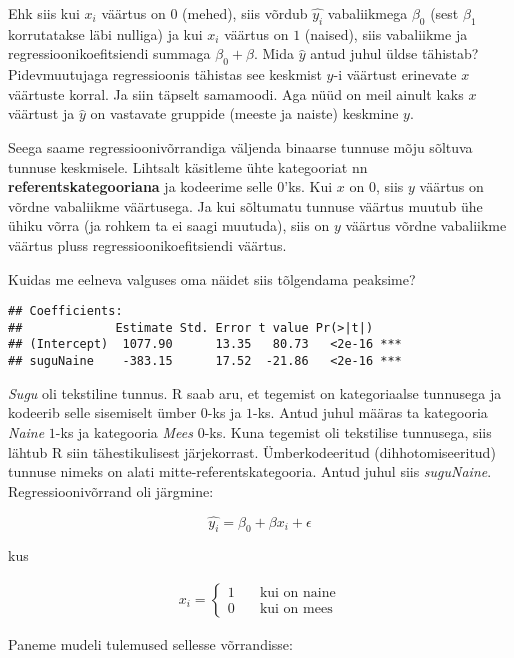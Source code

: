 \documentclass[
]{book}
\begin{document}
Ehk siis kui \(x_i\) väärtus on \(0\) (mehed), siis võrdub \(\hat{y_i}\) vabaliikmega \(\beta_0\) (sest \(\beta_1\) korrutatakse läbi nulliga) ja kui \(x_i\) väärtus on \(1\) (naised), siis vabaliikme ja regressioonikoefitsiendi summaga \(\beta_0+\beta\). Mida \(\hat{y}\) antud juhul üldse tähistab? Pidevmuutujaga regressioonis tähistas see keskmist \(y\)-i väärtust erinevate \(x\) väärtuste korral. Ja siin täpselt samamoodi. Aga nüüd on meil ainult kaks \(x\) väärtust ja \(\hat{y}\) on vastavate gruppide (meeste ja naiste) keskmine \(y\).

Seega saame regressioonivõrrandiga väljenda binaarse tunnuse mõju sõltuva tunnuse keskmisele. Lihtsalt käsitleme ühte kategooriat nn \textbf{referentskategooriana} ja kodeerime selle \(0\)'ks. Kui \(x\) on \(0\), siis \(y\) väärtus on võrdne vabaliikme väärtusega. Ja kui sõltumatu tunnuse väärtus muutub ühe ühiku võrra (ja rohkem ta ei saagi muutuda), siis on \(y\) väärtus võrdne vabaliikme väärtus pluss regressioonikoefitsiendi väärtus.

Kuidas me eelneva valguses oma näidet siis tõlgendama peaksime?

\begin{verbatim}
## Coefficients:
##             Estimate Std. Error t value Pr(>|t|)    
## (Intercept)  1077.90      13.35   80.73   <2e-16 ***
## suguNaine    -383.15      17.52  -21.86   <2e-16 ***
\end{verbatim}

\emph{Sugu} oli tekstiline tunnus. R saab aru, et tegemist on kategoriaalse tunnusega ja kodeerib selle sisemiselt ümber \(0\)-ks ja \(1\)-ks. Antud juhul määras ta kategooria \emph{Naine} \(1\)-ks ja kategooria \emph{Mees} \(0\)-ks. Kuna tegemist oli tekstilise tunnusega, siis lähtub R siin tähestikulisest järjekorrast. Ümberkodeeritud (dihhotomiseeritud) tunnuse nimeks on alati mitte-referentskategooria. Antud juhul siis \emph{suguNaine}. Regressioonivõrrand oli järgmine:

\[\hat{y_i}=\beta_0+\beta x_i+\epsilon\]

kus

\begin{align}
x_{i} =
  \begin{cases}
    1  & \quad \text{kui on naine}\\
    0  & \quad \text{kui on mees}
  \end{cases}
\end{align}

Paneme mudeli tulemused sellesse võrrandisse:
\end{document}
